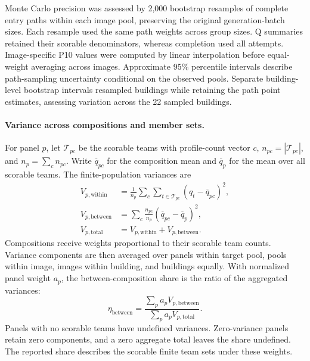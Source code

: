Monte Carlo precision was assessed by 2,000 bootstrap resamples of complete entry paths within each image pool, preserving the original generation-batch sizes. Each resample used the same path weights across group sizes. Q summaries retained their scorable denominators, whereas completion used all attempts. Image-specific P10 values were computed by linear interpolation before equal-weight averaging across images. Approximate 95\% percentile intervals describe path-sampling uncertainty conditional on the observed pools. Separate building-level bootstrap intervals resampled buildings while retaining the path point estimates, assessing variation across the 22 sampled buildings.

\paragraph{Variance across compositions and member sets.}
For panel \(p\), let \(\mathcal T_{pc}\) be the scorable teams with profile-count vector \(c\), \(n_{pc}=|\mathcal T_{pc}|\), and \(n_p=\sum_c n_{pc}\). Write \(\overline q_{pc}\) for the composition mean and \(\overline q_p\) for the mean over all scorable teams. The finite-population variances are
\begin{equation}
 \begin{aligned}
 V_{p,\mathrm{within}}
 &=\frac1{n_p}\sum_c\sum_{t\in\mathcal T_{pc}}
 (q_t-\overline q_{pc})^2,\\
 V_{p,\mathrm{between}}
 &=\sum_c\frac{n_{pc}}{n_p}(\overline q_{pc}-\overline q_p)^2,\\
 V_{p,\mathrm{total}}
 &=V_{p,\mathrm{within}}+V_{p,\mathrm{between}}.
 \end{aligned}
 \label{eq:composition-variance}
\end{equation}
Compositions receive weights proportional to their scorable team counts. Variance components are then averaged over panels within target pool, pools within image, images within building, and buildings equally. With normalized panel weight \(a_p\), the between-composition share is the ratio of the aggregated variances:
\begin{equation}
 \eta_{\mathrm{between}}
 =\frac{\sum_p a_pV_{p,\mathrm{between}}}
 {\sum_p a_pV_{p,\mathrm{total}}}.
 \label{eq:composition-share}
\end{equation}
Panels with no scorable teams have undefined variances. Zero-variance panels retain zero components, and a zero aggregate total leaves the share undefined. The reported share describes the scorable finite team sets under these weights.
